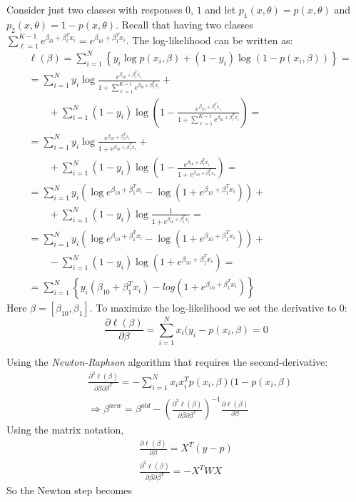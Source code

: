 \documentclass[12pt, letterpaper]{article}
\theoremstyle{definition}
\begin{document}
Consider just two classes with responses $0$, $1$ and let $p_1(x,\theta) =p(x,\theta) $ and $p_2(x,\theta) =1-p(x,\theta)$. Recall that having two classes $\sum_{\ell=1}^{K-1} e^{\beta_{l0}+\beta_\ell^Tx_i} = e^{\beta_{10}+\beta_1^Tx_i}$. The log-likelihood can be written as:
\begin{equation}
\begin{aligned}
&\ell(\beta) = \sum_{i=1}^N \left\lbrace y_i \log p\left(x_i,\beta\right) + \left(1-y_i\right) \log \left(1-p\left(x_i,\beta\right)\right)\right\rbrace =\\
&=\sum_{i=1}^N y_i \log \frac{e^{\beta_{10} +\beta_{1}^T x_i}}{1+\sum_{\ell=1}^{K-1} e^{\beta_{l0}+\beta_\ell^Tx_i}}  +\\
& \quad\quad + \sum_{i=1}^N \left(1-y_i\right) \log \left(1-\frac{e^{\beta_{10} +\beta_{1}^T x_i}}{1+\sum_{\ell=1}^{K-1} e^{\beta_{l0}+\beta_\ell^Tx_i}}\right)= \\
&= \sum_{i=1}^N  y_i \log \frac{e^{\beta_{10} +\beta_{1}^T x_i}}{1+e^{\beta_{10}+\beta_1^Tx_i}} + \\
&\quad\quad +\sum_{i=1}^N  \left(1-y_i\right) \log \left(1-\frac{e^{\beta_{10} +\beta_{1}^T x_i}}{1+e^{\beta_{10}+\beta_1^Tx_i}}\right) = \\
&=\sum_{i=1}^N y_i \left(\log e^{\beta_{10} +\beta_{1}^T x_i} -\log \left(1+ e^{\beta_{10}+\beta_1^Tx_i}\right) \right) + \\
& \quad\quad + \sum_{i=1}^N  \left(1-y_i\right) \log \frac{1}{1+ e^{\beta_{10}+\beta_1^Tx_i}} = \\
&=\sum_{i=1}^N y_i \left(\log e^{\beta_{10} +\beta_{1}^T x_i} -\log \left(1+ e^{\beta_{10}+\beta_1^Tx_i}\right) \right) + \\
& \quad\quad - \sum_{i=1}^N\left(1-y_i\right) \log \left(1+ e^{\beta_{10}+\beta_1^Tx_i}\right) = \\
&=\sum_{i=1}^N \left\lbrace y_i \left(\beta_{10} +\beta_{1}^T x_i \right) -log \left(1+ e^{\beta_{10}+\beta_1^Tx_i}\right) \right\rbrace
\end{aligned}
\end{equation}
Here $\beta = \left[ \beta_{10}, \beta_1\right]$. To maximize the log-likelihood we set the derivative to $0$:
\begin{equation}
\frac{\partial \ell(\beta)}{\partial \beta} = \sum_{i=1}^N x_i  (y_i - p(x_i, \beta) = 0
\end{equation}

Using the \textit{Newton-Raphson} algorithm that requires the second-derivative:
\begin{align}
&\frac{\partial^2 \ell(\beta)}{\partial \beta \partial \beta^T} = -\sum_{i=1}^N x_ix_i^T   p(x_i, \beta) (1-p(x_i, \beta)\\
&\Rightarrow \beta^{new} = \beta^{old} - \left( \frac{\partial^2 \ell\left( \beta\right) }{\partial \beta \partial \beta^T} \right)^{-1}\frac{\partial \ell(\beta)}{\partial \beta}
\end{align}
Using the matrix notation,
\begin{align}
\frac{\partial \ell(\beta)}{\partial \beta} =  X^T (y-p) \\
\frac{\partial^2 \ell(\beta)}{\partial \beta \partial \beta^T} = -X^TWX
\end{align}
So the Newton step becomes
\end{document}
